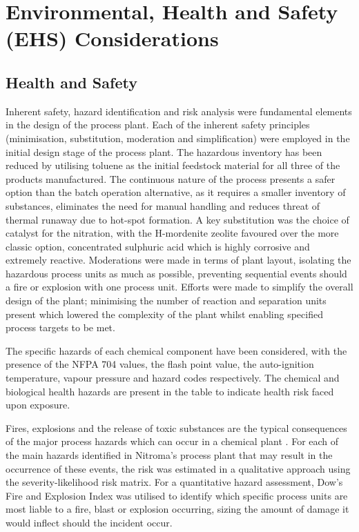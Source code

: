 \section{Environmental, Health and Safety (EHS) Considerations}
\label{sec:ehs}


\subsection{Health and Safety}

Inherent safety, hazard identification and risk analysis were fundamental elements in the design of the process plant. Each of the inherent safety principles (minimisation, substitution, moderation and simplification) were employed in the initial design stage of the process plant. The hazardous inventory has been reduced by utilising toluene as the initial feedstock material for all three of the products manufactured. The continuous nature of the process presents a safer option than the batch operation alternative, as it requires a smaller inventory of substances, eliminates the need for manual handling and reduces threat of thermal runaway due to hot-spot formation. A key substitution was the choice of catalyst for the nitration, with the H-mordenite zeolite favoured over the more classic option, concentrated sulphuric acid which is highly corrosive and extremely reactive. Moderations were made in terms of plant layout, isolating the hazardous process units as much as possible, preventing sequential events should a fire or explosion with one process unit. Efforts were made to simplify the overall design of the plant; minimising the number of reaction and separation units present which lowered the complexity of the plant whilst enabling specified process targets to be met. 

The specific hazards of each chemical component have been considered, with the presence of the NFPA 704 values, the flash point value, the auto-ignition temperature, vapour pressure and hazard codes respectively. The chemical and biological health hazards are present in the table to indicate health risk faced upon exposure.  

Fires, explosions and the release of toxic substances are the typical consequences of the major process hazards which can occur in a chemical plant \cite{mannan_lees_2012}. For each of the main hazards identified in Nitroma's process plant that may result in the occurrence of these events, the risk was estimated in a qualitative approach using the severity-likelihood risk matrix. For a quantitative hazard assessment, Dow's Fire and Explosion Index was utilised to identify which specific process units are most liable to  a fire, blast or explosion occurring, sizing the amount of damage it would inflect should the incident occur. 

